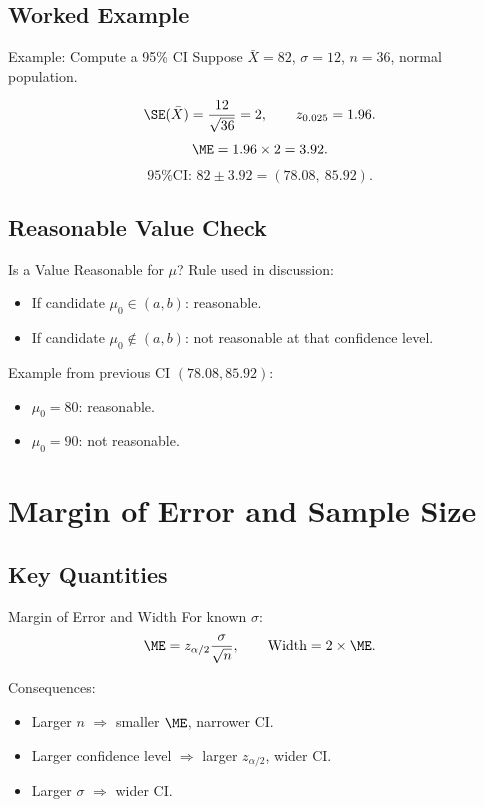 \documentclass[aspectratio=169]{beamer}
\begin{document}
\subsection{Worked Example}
\begin{frame}{Example: Compute a 95\% CI}
  Suppose \(\bar X=82\), \(\sigma=12\), \(n=36\), normal population.

  \[
    \SE(\bar X)=\frac{12}{\sqrt{36}}=2,
    \qquad
    z_{0.025}=1.96.
  \]
  \[
    \ME=1.96\times 2=3.92.
  \]
  \[
    \text{95\% CI: }82\pm 3.92=(78.08,\ 85.92).
  \]
\end{frame}

\subsection{Reasonable Value Check}
\begin{frame}{Is a Value Reasonable for \(\mu\)?}
  Rule used in discussion:
  \begin{itemize}
    \item If candidate \(\mu_0\in(a,b)\): reasonable.
    \item If candidate \(\mu_0\notin(a,b)\): not reasonable at that confidence level.
  \end{itemize}

  \vspace{2mm}
  Example from previous CI \((78.08,85.92)\):
  \begin{itemize}
    \item \(\mu_0=80\): reasonable.
    \item \(\mu_0=90\): not reasonable.
  \end{itemize}
\end{frame}

\section{Margin of Error and Sample Size}

\subsection{Key Quantities}
\begin{frame}{Margin of Error and Width}
  For known \(\sigma\):
  \[
    \ME = z_{\alpha/2}\frac{\sigma}{\sqrt{n}},
    \qquad
    \text{Width}=2\times \ME.
  \]

  \vspace{2mm}
  Consequences:
  \begin{itemize}
    \item Larger \(n\) \(\Rightarrow\) smaller \(\ME\), narrower CI.
    \item Larger confidence level \(\Rightarrow\) larger \(z_{\alpha/2}\), wider CI.
    \item Larger \(\sigma\) \(\Rightarrow\) wider CI.
  \end{itemize}
\end{frame}
\end{document}
